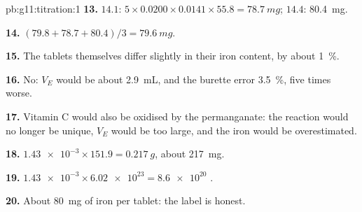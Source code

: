 \begin{solution}{pb:g11:titration:1}
\textbf{13.} $14.1$: $5 \times 0.0200 \times 0.0141 \times 55.8 =
\qty{78.7}{mg}$; $14.4$: \qty{80.4}{mg}.

\textbf{14.} $(79.8 + 78.7 + 80.4)/3 = \qty{79.6}{mg}$.

\textbf{15.} The tablets themselves differ slightly in their iron
content, by about \qty{1}{\percent}.

\textbf{16.} No: $V_E$ would be about \qty{2.9}{mL}, and the burette
error \qty{3.5}{\percent}, five times worse.

\textbf{17.} Vitamin C would also be oxidised by the permanganate: the
reaction would no longer be unique, $V_E$ would be too large, and the
iron would be overestimated.

\textbf{18.} $\num{1.43e-3} \times 151.9 = \qty{0.217}{g}$, about
\qty{217}{mg}.

\textbf{19.} $\num{1.43e-3} \times \num{6.02e23} = \num{8.6e20}$ .

\textbf{20.} About \qty{80}{mg} of iron per tablet: the label is
honest.
\end{solution}
